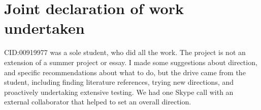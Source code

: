 \chapter*{\centering Joint declaration of work undertaken}

CID:00919977 was a sole student, who did all the work.  The project is not an extension of a summer project or essay. I made some suggestions about direction, and specific recommendations about what to do, but the drive came from the student, including finding literature references, trying new directions, and proactively undertaking extensive testing.  We had one Skype call with an external collaborator that helped to set an overall direction.  
